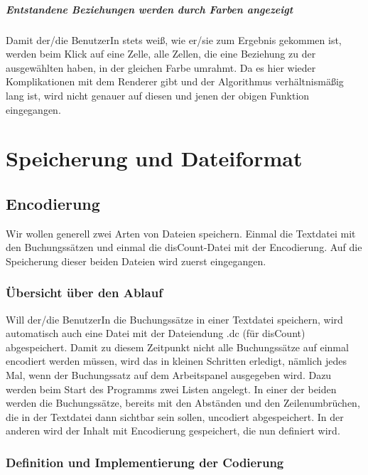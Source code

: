 \documentclass[12pt]{report}
\begin{document}
\subsubsection{Entstandene Beziehungen werden durch Farben angezeigt}
Damit der/die BenutzerIn stets weiß, wie er/sie zum Ergebnis gekommen ist, werden beim Klick auf eine Zelle, alle Zellen, die eine Beziehung zu der ausgewählten haben, in der gleichen Farbe umrahmt. Da es hier wieder Komplikationen mit dem Renderer gibt und der Algorithmus verhältnismäßig lang ist, wird nicht genauer auf diesen und jenen der obigen Funktion eingegangen.





\part{Speicherung und Dateiformat}

\chapter{Encodierung}
\lhead{\thepage}
Wir wollen generell zwei Arten von Dateien speichern. Einmal die Textdatei mit den Buchungssätzen und einmal die disCount-Datei mit der Encodierung. Auf die Speicherung dieser beiden Dateien wird zuerst eingegangen.


\section{Übersicht über den Ablauf}
Will der/die BenutzerIn die Buchungssätze in einer Textdatei speichern, wird automatisch auch eine Datei mit der Dateiendung .dc (für disCount) abgespeichert. Damit zu diesem Zeitpunkt nicht alle Buchungssätze auf einmal encodiert werden müssen, wird das in kleinen Schritten erledigt, nämlich jedes Mal, wenn der Buchungssatz auf dem Arbeitspanel ausgegeben wird. Dazu werden beim Start des Programms zwei Listen angelegt. In einer der beiden werden die Buchungssätze, bereits mit den Abständen und den Zeilenumbrüchen, die in der Textdatei dann sichtbar sein sollen, uncodiert abgespeichert. In der anderen wird der Inhalt mit Encodierung gespeichert, die nun definiert wird.

\section{Definition und Implementierung der Codierung}
\end{document}
